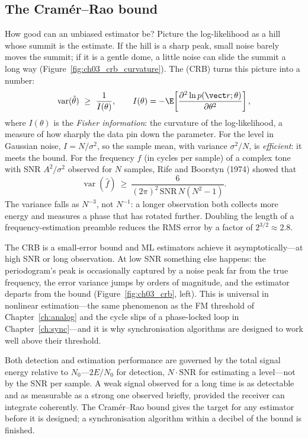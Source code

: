 \subsection{The Cram\'er--Rao bound}

How good can an unbiased estimator be? Picture the log-likelihood as a hill whose summit is the estimate. If
the hill is a sharp peak, small noise barely moves the summit; if it is a gentle dome, a little noise can
slide the summit a long way (Figure~\ref{fig:ch03_crb_curvature}). The  (CRB) turns
this picture into a number:
\begin{equation}
\operatorname{var}(\hat\theta)\ \ge\ \frac{1}{I(\theta)},\qquad
I(\theta)=-\E\!\left[\frac{\partial^2\ln p(\vect r;\theta)}{\partial\theta^2}\right],
\label{eq:ch03:crb}
\end{equation}
where $I(\theta)$ is the \emph{Fisher information}: the curvature of the log-likelihood, a measure of how
sharply the data pin down the parameter. For the level in Gaussian noise, $I=N/\sigma^2$, so the sample mean,
with variance $\sigma^2/N$, is \emph{efficient}: it meets the bound. For the frequency $f$ (in cycles per
sample) of a complex tone with SNR $A^2/\sigma^2$ observed for $N$ samples, Rife and Boorstyn (1974) showed
that
\begin{equation}
\operatorname{var}(\hat f)\ \ge\ \frac{6}{(2\pi)^2\,\mathrm{SNR}\,N(N^2-1)} .
\label{eq:ch03:crbfreq}
\end{equation}
The variance falls as $N^{-3}$, not $N^{-1}$: a longer observation both collects more energy and measures a
phase that has rotated further. Doubling the length of a frequency-estimation preamble reduces the RMS error
by a factor of $2^{3/2}\approx2.8$.

The CRB is a small-error bound and ML estimators achieve it asymptotically---at high SNR or long
observation. At low SNR something else happens: the periodogram's peak is occasionally captured by a noise
peak far from the true frequency, the error variance jumps by orders of magnitude, and the estimator departs
from the bound (Figure~\ref{fig:ch03_crb}, left). This  is universal in nonlinear
estimation---the same phenomenon as the FM threshold of Chapter~\ref{ch:analog} and the cycle slips of a
phase-locked loop in Chapter~\ref{ch:sync}---and it is why synchronisation algorithms are designed to work
well above their threshold.

\begin{keyidea}
Both detection and estimation performance are governed by the total signal energy relative to
$N_0$---$2E/N_0$ for detection, $N\cdot\mathrm{SNR}$ for estimating a level---not by the SNR per sample. A
weak signal observed for a long time is as detectable and as measurable as a strong one observed briefly,
provided the receiver can integrate coherently. The Cram\'er--Rao bound gives the target for any estimator
before it is designed; a synchronisation algorithm within a decibel of the bound is finished.
\end{keyidea}

